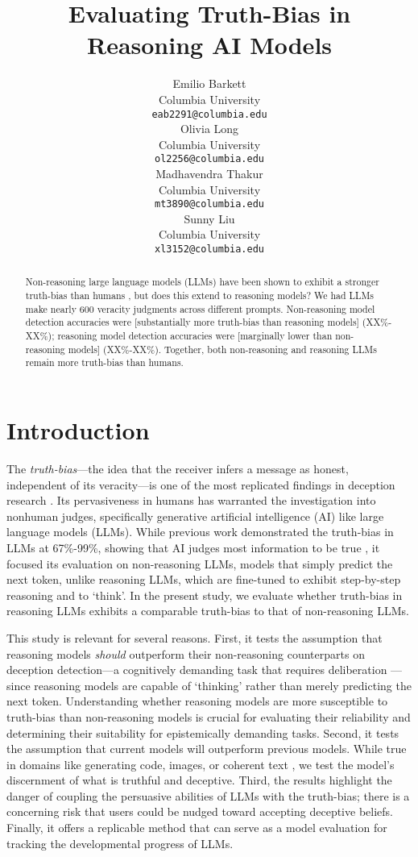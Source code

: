 \documentclass{article}
\title{Evaluating Truth-Bias in Reasoning AI Models}
\author{%
  Emilio Barkett\\
  Columbia University\\
  \texttt{eab2291@columbia.edu} \\
   \And
   Olivia Long \\
   Columbia University \\
   \texttt{ol2256@columbia.edu} \\
   \AND
   Madhavendra Thakur \\
   Columbia University \\
   \texttt{mt3890@columbia.edu} \\
   \And
   Sunny Liu\\
   Columbia University \\
   \texttt{xl3152@columbia.edu} \\
}
\begin{document}
\maketitle


\begin{abstract}
  Non-reasoning large language models (LLMs) have been shown to exhibit a stronger truth-bias than humans \citep{markowitz_generative_2024}, but does this extend to reasoning models? We had LLMs make nearly 600 veracity judgments across different prompts. Non-reasoning model detection accuracies were [substantially more truth-bias than reasoning models] (XX\%-XX\%); reasoning model detection accuracies were [marginally lower than non-reasoning models] (XX\%-XX\%). Together, both non-reasoning and reasoning LLMs remain more truth-bias than humans.
\end{abstract}

\section{Introduction}

The \textit{truth-bias}---the idea that the receiver infers a message as honest, independent of its veracity---is one of the most replicated findings in deception research \citep{levine_duped_2020, levine_truth-default_2014}. Its pervasiveness in humans has warranted the investigation into nonhuman judges, specifically generative artificial intelligence (AI) like large language models (LLMs). While previous work demonstrated the truth-bias in LLMs at 67\%-99\%, showing that AI judges most information to be true \citep{markowitz_generative_2024}, it focused its evaluation on non-reasoning LLMs, models that simply predict the next token, unlike reasoning LLMs, which are fine-tuned to exhibit step-by-step reasoning and to `think'. In the present study, we evaluate whether truth-bias in reasoning LLMs exhibits a comparable truth-bias to that of non-reasoning LLMs.

This study is relevant for several reasons. First, it tests the assumption that reasoning models \textit{should} outperform their non-reasoning counterparts on deception detection---a cognitively demanding task that requires deliberation \citep{mccornack_deception_1986}---since reasoning models are capable of `thinking' rather than merely predicting the next token. Understanding whether reasoning models are more susceptible to truth-bias than non-reasoning models is crucial for evaluating their reliability and determining their suitability for epistemically demanding tasks. Second, it tests the assumption that current models will outperform previous models. While true in domains like generating code, images, or coherent text \citep{handa2025economictasksperformedai, anthropic_anthropic_2025}, we test the model's discernment of what is truthful and deceptive. Third, the results highlight the danger of coupling the persuasive abilities of LLMs with the truth-bias; there is a concerning risk that users could be nudged toward accepting deceptive beliefs. Finally, it offers a replicable method that can serve as a model evaluation for tracking the developmental progress of LLMs.
\end{document}
